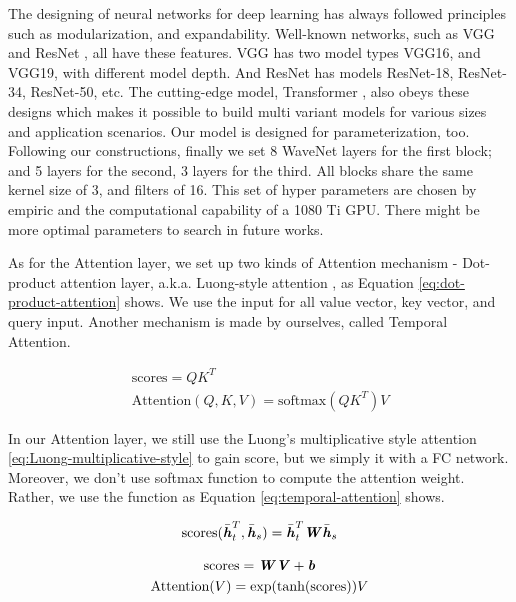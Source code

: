 \documentclass[sigconf]{acmart}
\begin{document}
The designing of neural networks for deep learning has always followed principles such as modularization, and expandability. Well-known networks, such as VGG \cite{simonyan2014very} and ResNet \cite{he2016deep}, all have these features. VGG has two model types VGG16, and VGG19, with different model depth. And ResNet has models ResNet-18, ResNet-34, ResNet-50, etc. The cutting-edge model, Transformer \cite{vaswani2017attention}, also obeys these designs which makes it possible to build multi variant models for various sizes and application scenarios. Our model is designed for parameterization, too. Following our constructions, finally we set 8 WaveNet layers for the first block; and 5 layers for the second, 3 layers for the third. All blocks share the same kernel size of 3, and filters of 16. This set of hyper parameters are chosen by empiric and the computational capability of a 1080 Ti GPU. There might be more optimal parameters to search in future works.

As for the Attention layer, we set up two kinds of Attention mechanism - Dot-product attention layer, a.k.a. Luong-style attention \cite{luong2015effective}, as Equation \ref{eq:dot-product-attention} shows. We use the input for all value vector, key vector, and query input. Another mechanism is made by ourselves, called Temporal Attention. 

\begin{gather}
    \text{scores}=QK^T \\
    \text{Attention}(Q, K, V ) = \text{softmax}(QK^T)V
    \label{eq:dot-product-attention}
\end{gather}

In our Attention layer, we still use the Luong's multiplicative style attention \ref{eq:Luong-multiplicative-style} to gain score, but we simply it with a FC network. Moreover, we don't use softmax function to compute the attention weight. Rather, we use the function as Equation \ref{eq:temporal-attention} shows.

\begin{equation}
    \text{scores}(\bar {\textbf{\textit h}}_t^T,\bar {\textbf{\textit h}}_s)=\bar {\textbf{\textit h}}_t^T\textbf{\textit W}\bar {\textbf{\textit h}}_s 
    \label{eq:Luong-multiplicative-style}
\end{equation}

\begin{gather}
    \text{scores}=\textbf{\textit W}\textbf{\textit V}+\textbf{\textit b} \\
    \text{Attention}(V) = \text{exp}(\text{tanh}(\text{scores}))V
    \label{eq:temporal-attention}
\end{gather}
\end{document}

